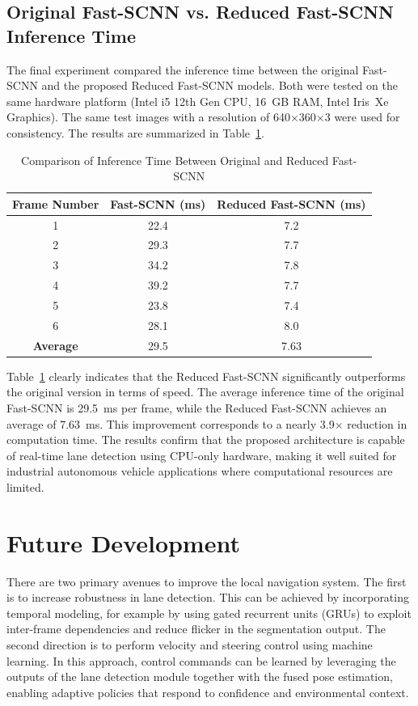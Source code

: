 \documentclass[conference, a4paper]{IEEEtran}
\begin{document}
\subsection{Original Fast-SCNN vs. Reduced Fast-SCNN Inference Time}
The final experiment compared the inference time between the original Fast-SCNN and the proposed Reduced Fast-SCNN models. Both were tested on the same hardware platform (Intel i5 12th Gen CPU, 16~GB RAM, Intel Iris~Xe Graphics). The same test images with a resolution of 640$\times$360$\times$3 were used for consistency. The results are summarized in Table~\ref{tab:lane_detection_inference_time}.

\begin{table}[H]
	\centering
	\caption{Comparison of Inference Time Between Original and Reduced Fast-SCNN}
	\label{tab:lane_detection_inference_time}
	\begin{tabular}{|c|c|c|}
		\hline
		\textbf{Frame Number} & \textbf{Fast-SCNN (ms)} & \textbf{Reduced Fast-SCNN (ms)} \\ \hline
		1 & 22.4 & 7.2 \\ \hline
		2 & 29.3 & 7.7 \\ \hline
		3 & 34.2 & 7.8 \\ \hline
		4 & 39.2 & 7.7 \\ \hline
		5 & 23.8 & 7.4 \\ \hline
		6 & 28.1 & 8.0 \\ \hline
		\textbf{Average} & 29.5 & 7.63 \\ \hline
	\end{tabular}
\end{table}

Table~\ref{tab:lane_detection_inference_time} clearly indicates that the Reduced Fast-SCNN significantly outperforms the original version in terms of speed. The average inference time of the original Fast-SCNN is 29.5~ms per frame, while the Reduced Fast-SCNN achieves an average of 7.63~ms. This improvement corresponds to a nearly 3.9$\times$ reduction in computation time. The results confirm that the proposed architecture is capable of real-time lane detection using CPU-only hardware, making it well suited for industrial autonomous vehicle applications where computational resources are limited.


\section{Future Development}
There are two primary avenues to improve the local navigation system. The first is to increase robustness in lane detection. This can be achieved by incorporating temporal modeling, for example by using gated recurrent units (GRUs) \cite{ref_gru} to exploit inter-frame dependencies and reduce flicker in the segmentation output. The second direction is to perform velocity and steering control using machine learning. In this approach, control commands can be learned by leveraging the outputs of the lane detection module together with the fused pose estimation, enabling adaptive policies that respond to confidence and environmental context.
\end{document}
